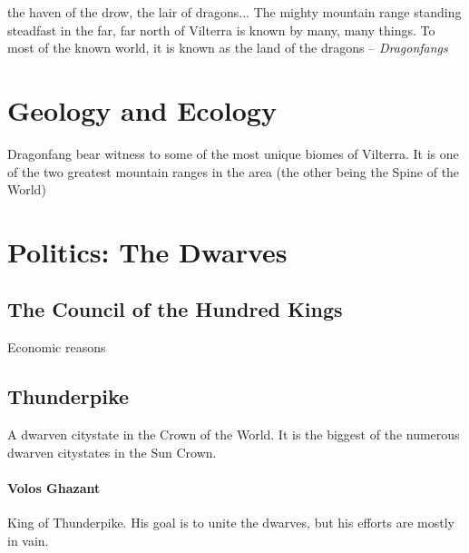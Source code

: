\documentclass[../main.tex]{subfiles}
\begin{document}
 the haven of the drow,
the lair of dragons... The mighty mountain range standing steadfast in the far,
far north of Vilterra is known by many, many things. To
most of the known world, it is known as the land of the
dragons -- \emph{Dragonfangs}

\section{Geology and Ecology}
Dragonfang bear witness to some of the most unique
biomes of Vilterra. It is one of the two greatest
mountain ranges in the area (the other being the Spine of
the World)

\section{Politics: The Dwarves}

\subsection{The Council of the Hundred Kings}
Economic reasons

\subsection{Thunderpike}
A dwarven citystate in the Crown of the World. It is the
biggest of the numerous dwarven citystates in the
Sun Crown.

\paragraph{Volos Ghazant}
King of Thunderpike. His goal is to unite the dwarves, but
his efforts are mostly in vain.
\end{document}
